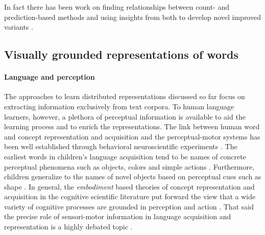 In fact there has been work on finding relationships between
count- and prediction-based methods \citep{levy2014neural} and
using insights from both to develop novel improved
variants \citep{levy2015improving}.





\subsection{Visually grounded representations of words}
\label{sec:visualwords}

\paragraph{Language and perception}
The approaches to learn distributed representations discussed so far focus on extracting information exclusively
from text corpora. To human language learners, however, a plethora of perceptual information is available to aid the
learning process and to enrich the representations. The link between human word and concept representation
and acquisition and the perceptual-motor systems has been well established through behavioral
neuroscientific experiments \citep{pulvermuller2005brain}.
The earliest words in children's language acquisition tend to be names of concrete perceptual phenomena
such as objects, colors and simple actions \citep{bornstein2004cross}. Furthermore, children generalize to
the names of novel objects based on perceptual cues such as shape \citep{landau1998object}.
In general, the \emph{embodiment} based theories of concept representation and acquisition in the
cognitive scientific literature put forward the view that a wide variety of cognitive processes
are grounded in perception and action \citep{meteyard2008role}. That said the precise role of
sensori-motor information in language acquisition and representation is a highly
debated topic \citep{meteyard2012coming}.


